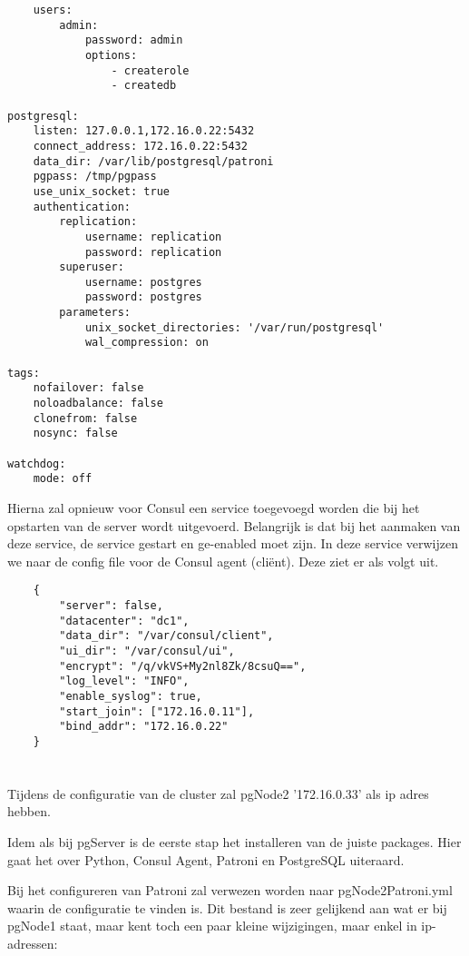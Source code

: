 \begin{lstlisting}
    users:
        admin:
            password: admin
            options:
                - createrole
                - createdb

postgresql:
    listen: 127.0.0.1,172.16.0.22:5432
    connect_address: 172.16.0.22:5432
    data_dir: /var/lib/postgresql/patroni
    pgpass: /tmp/pgpass
    use_unix_socket: true
    authentication:
        replication:
            username: replication
            password: replication
        superuser:
            username: postgres
            password: postgres
        parameters:
            unix_socket_directories: '/var/run/postgresql'
            wal_compression: on

tags:
    nofailover: false
    noloadbalance: false
    clonefrom: false
    nosync: false

watchdog:
    mode: off
\end{lstlisting}

Hierna zal opnieuw voor Consul een service toegevoegd worden die bij het opstarten van de server wordt uitgevoerd. Belangrijk is dat bij het aanmaken van deze service, de service gestart en ge-enabled moet zijn. In deze service verwijzen we naar de config file voor de Consul agent (cliënt). Deze ziet er als volgt uit.

\begin{lstlisting}
    {
        "server": false,
        "datacenter": "dc1",
        "data_dir": "/var/consul/client",
        "ui_dir": "/var/consul/ui",
        "encrypt": "/q/vkVS+My2nl8Zk/8csuQ==", 
        "log_level": "INFO",
        "enable_syslog": true,
        "start_join": ["172.16.0.11"],
        "bind_addr": "172.16.0.22"
    }  
\end{lstlisting}


\section{}
\label{sec:pgNode2}
Tijdens de configuratie van de cluster zal pgNode2 '172.16.0.33' als ip adres hebben.

Idem als bij pgServer is de eerste stap het installeren van de juiste packages. Hier gaat het over Python, Consul Agent, Patroni en PostgreSQL uiteraard.

Bij het configureren van Patroni zal verwezen worden naar pgNode2Patroni.yml waarin de configuratie te vinden is. Dit bestand is zeer gelijkend aan wat er bij pgNode1 staat, maar kent toch een paar kleine wijzigingen, maar enkel in ip-adressen:

